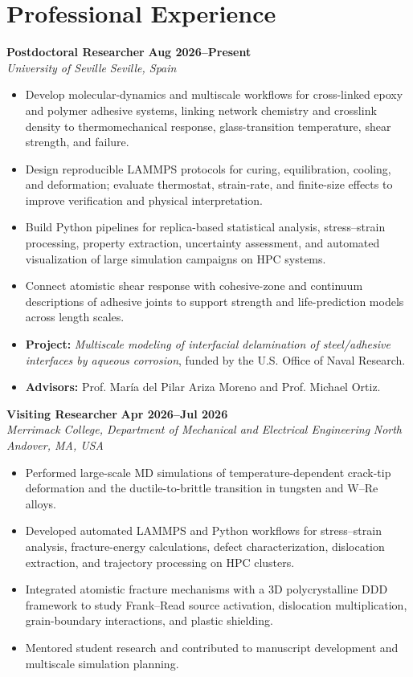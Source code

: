 \documentclass[10pt,a4paper]{article}
\newcommand{\role}[4]{%
  \textbf{#1} \hfill \textbf{#2}\\[-1pt]
  \textit{#3} \hfill \textit{#4}\vspace{1pt}
}
\begin{document}
\section{Professional Experience}
\role{Postdoctoral Researcher}{Aug 2026--Present}{University of Seville}{Seville, Spain}
\begin{itemize}
  \item Develop molecular-dynamics and multiscale workflows for cross-linked epoxy and polymer adhesive systems, linking network chemistry and crosslink density to thermomechanical response, glass-transition temperature, shear strength, and failure.
  \item Design reproducible LAMMPS protocols for curing, equilibration, cooling, and deformation; evaluate thermostat, strain-rate, and finite-size effects to improve verification and physical interpretation.
  \item Build Python pipelines for replica-based statistical analysis, stress--strain processing, property extraction, uncertainty assessment, and automated visualization of large simulation campaigns on HPC systems.
  \item Connect atomistic shear response with cohesive-zone and continuum descriptions of adhesive joints to support strength and life-prediction models across length scales.
  \item \textbf{Project:} \textit{Multiscale modeling of interfacial delamination of steel/adhesive interfaces by aqueous corrosion}, funded by the U.S. Office of Naval Research.
  \item \textbf{Advisors:} Prof. Mar\'{i}a del Pilar Ariza Moreno and Prof. Michael Ortiz.
\end{itemize}

\role{Visiting Researcher}{Apr 2026--Jul 2026}{Merrimack College, Department of Mechanical and Electrical Engineering}{North Andover, MA, USA}
\begin{itemize}
  \item Performed large-scale MD simulations of temperature-dependent crack-tip deformation and the ductile-to-brittle transition in tungsten and W--Re alloys.
  \item Developed automated LAMMPS and Python workflows for stress--strain analysis, fracture-energy calculations, defect characterization, dislocation extraction, and trajectory processing on HPC clusters.
  \item Integrated atomistic fracture mechanisms with a 3D polycrystalline DDD framework to study Frank--Read source activation, dislocation multiplication, grain-boundary interactions, and plastic shielding.
  \item Mentored student research and contributed to manuscript development and multiscale simulation planning.
\end{itemize}
\end{document}
